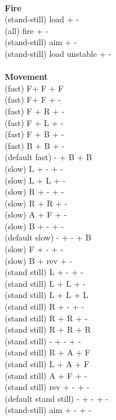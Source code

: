 \ \\ {\bf Fire } \\
(stand-still) load + - \\
(all) fire + - \\
(stand-still) aim + - \\
(stand-still) load unstable + -  \\
\ \\ {\bf Movement } \\
(fast) F+ F + F \\
(fast) F+ F + - \\
(fast) F + R + - \\
(fast) F + L + - \\
(fast) F + B + - \\
(fast) B + B + - \\
(default fast) - + B + B \\
(slow) L + - + - \\
(slow) L + L + - \\
(slow) R + - + - \\
(slow) R + R + - \\
(slow) A + F + - \\
(slow) B + - + - \\
(default slow)  - + - + B \\
(slow) F + - + - \\
(slow) B + rev + - \\
(stand still) L + - + - \\
(stand still) L + L + - \\
(stand still) L + L + L \\
(stand still) R + - + - \\
(stand still) R + R + - \\
(stand still) R + R + R \\
(stand still) - + - + - \\
(stand still) R + A + F \\
(stand still) L + A + F \\
(stand still) A + F + - \\
(stand still) rev + - + - \\
(default stand still) - + - + - \\
(stand-still) aim + - + - \\



